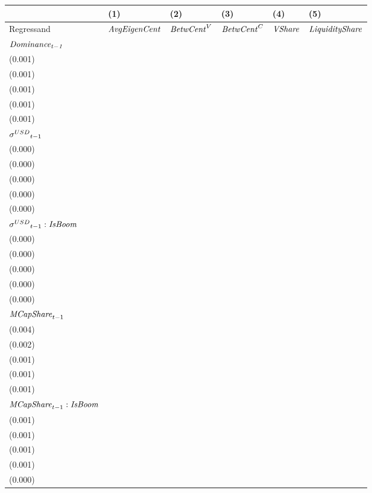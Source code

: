 \begin{tabular}{llllll}
\toprule
{} &                                   (1) &                                   (2) &                                   (3) &                                   (4) &                                   (5) \\
\midrule
Regressand                                  &                  ${\it AvgEigenCent}$ &                    ${\it BetwCent}^V$ &                    ${\it BetwCent}^C$ &                        ${\it VShare}$ &                ${\it LiquidityShare}$ \\
$\it Dominance_{t-1}$                       &   \makecell{$0.835^{***}$ \\ (0.001)} &   \makecell{$0.951^{***}$ \\ (0.001)} &   \makecell{$0.952^{***}$ \\ (0.001)} &   \makecell{$0.883^{***}$ \\ (0.001)} &   \makecell{$0.922^{***}$ \\ (0.001)} \\
${{\it \sigma}^{USD}}_{t-1}$                &     \makecell{$-0.000^{}$ \\ (0.000)} &      \makecell{$0.000^{}$ \\ (0.000)} &      \makecell{$0.000^{}$ \\ (0.000)} &     \makecell{$-0.000^{}$ \\ (0.000)} &     \makecell{$-0.000^{}$ \\ (0.000)} \\
${{\it \sigma}^{USD}}_{t-1} : {\it IsBoom}$ &    \makecell{$0.000^{**}$ \\ (0.000)} &     \makecell{$-0.000^{}$ \\ (0.000)} &     \makecell{$-0.000^{}$ \\ (0.000)} &      \makecell{$0.000^{}$ \\ (0.000)} &      \makecell{$0.000^{}$ \\ (0.000)} \\
${{\it MCapShare}}_{t-1}$                   &   \makecell{$0.012^{***}$ \\ (0.004)} &   \makecell{$0.033^{***}$ \\ (0.002)} &   \makecell{$0.036^{***}$ \\ (0.001)} &   \makecell{$0.031^{***}$ \\ (0.001)} &   \makecell{$0.043^{***}$ \\ (0.001)} \\
${{\it MCapShare}}_{t-1} : {\it IsBoom}$    &   \makecell{$0.007^{***}$ \\ (0.001)} &   \makecell{$0.033^{***}$ \\ (0.001)} &   \makecell{$0.018^{***}$ \\ (0.001)} &   \makecell{$0.013^{***}$ \\ (0.001)} &   \makecell{$0.005^{***}$ \\ (0.000)} \\

\end{tabular}
